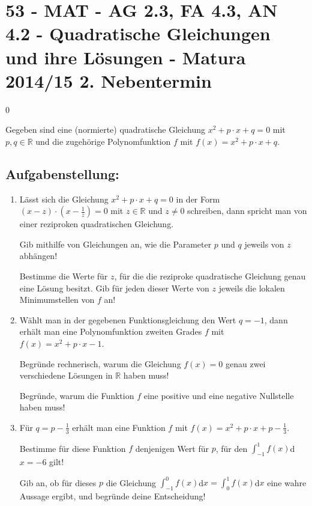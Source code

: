 \section{53 - MAT - AG 2.3, FA 4.3, AN 4.2 - Quadratische Gleichungen und ihre Lösungen - Matura 2014/15 2. Nebentermin}

\begin{langesbeispiel} \item[0] %
				
	Gegeben sind eine (normierte) quadratische Gleichung $x^2+p\cdot x+q=0$ mit $p,q\in\mathbb{R}$ und die zugehörige Polynomfunktion $f$ mit $f(x)=x^2+p\cdot x+q$.

\subsection{Aufgabenstellung:}
\begin{enumerate}
	\item Lässt sich die Gleichung $x^2+p\cdot x+q=0$ in der Form $\left(x-z\right)\cdot\left(x-\frac{1}{z}\right)=0$ mit $z\in\mathbb{R}$ und $z\neq 0$ schreiben, dann spricht man von einer reziproken quadratischen Gleichung.\leer
	
	Gib mithilfe von Gleichungen an, wie die Parameter $p$ und $q$ jeweils von $z$ abhängen!\leer
	
	Bestimme die Werte für $z$, für die die reziproke quadratische Gleichung genau eine Lösung besitzt. Gib für jeden dieser Werte von $z$ jeweils die lokalen Minimumstellen von $f$ an!\leer
	
\item Wählt man in der gegebenen Funktionsgleichung den Wert $q=-1$, dann erhält man eine Polynomfunktion zweiten Grades $f$ mit $f(x)=x^2+p\cdot x-1$.\leer

 Begründe rechnerisch, warum die Gleichung $f(x)=0$ genau zwei verschiedene Lösungen in $\mathbb{R}$ haben muss!\leer

Begründe, warum die Funktion $f$ eine positive und eine negative Nullstelle haben muss!\leer

\item Für $q=p-\frac{1}{3}$ erhält man eine Funktion $f$ mit $f(x)=x^2+p\cdot x+p-\frac{1}{3}$.\leer

Bestimme für diese Funktion $f$ denjenigen Wert für $p$, für den $\int^{1}_{-1}{f(x)}$d$x=-6$ gilt!\leer

Gib an, ob für dieses $p$ die Gleichung $\int^0_{-1}{f(x)}$d$x=\int^1_0{f(x)}$d$x$ eine wahre Aussage ergibt, und begründe deine Entscheidung!
						\end{enumerate}\leer
				

\end{langesbeispiel}
